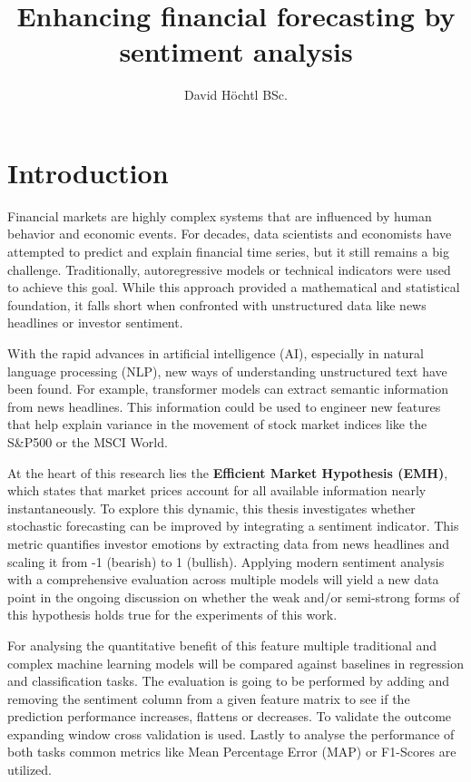 \documentclass[Master,english,IEEE]{twbook}
\title{Enhancing financial forecasting by sentiment analysis}
\author{David Höchtl BSc.}
\begin{document}
\maketitle

\chapter{Introduction}
Financial markets are highly complex systems that are influenced by human behavior and economic events. For decades, data scientists and economists have attempted to predict and explain financial time series, but it still remains a big challenge. Traditionally, autoregressive models or technical indicators were used to achieve this goal. While this approach provided a mathematical and statistical foundation, it falls short when confronted with unstructured data like news headlines or investor sentiment.

With the rapid advances in artificial intelligence (AI), especially in natural language processing (NLP), new ways of understanding unstructured text have been found. For example, transformer models can extract semantic information from news headlines. This information could be used to engineer new features that help explain variance in the movement of stock market indices like the S\&P500 or the MSCI World.

At the heart of this research lies the \textbf{Efficient Market Hypothesis (EMH)}, which states that market prices account for all available information nearly instantaneously. To explore this dynamic, this thesis investigates whether stochastic forecasting can be improved by integrating a sentiment indicator. This metric quantifies investor emotions by extracting data from news headlines and scaling it from -1 (bearish) to 1 (bullish). Applying modern sentiment analysis with a comprehensive evaluation across multiple models will yield a new data point in the ongoing discussion on whether the weak and/or semi-strong forms of this hypothesis holds true for the experiments of this work.

For analysing the quantitative benefit of this feature multiple traditional and complex machine learning models will be compared against baselines in regression and classification tasks. The evaluation is going to be performed by adding and removing the sentiment column from a given feature matrix to see if the prediction performance increases, flattens or decreases. To validate the outcome expanding window cross validation is used. Lastly to analyse the performance of both tasks common metrics like Mean Percentage Error (MAP) or F1-Scores are utilized.
\end{document}
